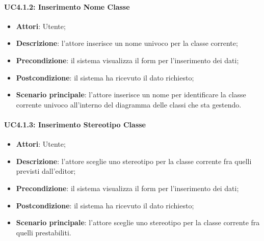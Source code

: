 \paragraph{UC4.1.2: Inserimento Nome Classe}
\label{UC4.1.2}
\begin{itemize}
\item \textbf{Attori}: Utente;
\item \textbf{Descrizione}: l'attore inserisce un nome univoco per la classe corrente;
\item \textbf{Precondizione}: il sistema visualizza il form per l'inserimento dei dati;
\item \textbf{Postcondizione}: il sistema ha ricevuto il dato richiesto;
\item \textbf{Scenario principale}:
l'attore inserisce un nome per identificare la classe corrente univoco all'interno del diagramma delle classi che sta gestendo.
\end{itemize}

\paragraph{UC4.1.3: Inserimento Stereotipo Classe}
\label{UC4.1.3}
\begin{itemize}
\item \textbf{Attori}: Utente;
\item \textbf{Descrizione}: l'attore sceglie uno stereotipo per la classe corrente fra quelli previsti dall'editor;
\item \textbf{Precondizione}: il sistema visualizza il form per l'inserimento dei dati;
\item \textbf{Postcondizione}: il sistema ha ricevuto il dato richiesto;
\item \textbf{Scenario principale}:
l'attore sceglie uno stereotipo per la classe corrente fra quelli prestabiliti.
\end{itemize}


